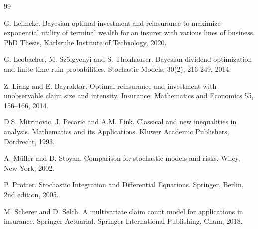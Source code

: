 \documentclass[reqno, 11pt]{amsart}%
\theoremstyle{definition}
\numberwithin{equation}{section} \numberwithin{theorem}{section}
\begin{document}
\begin{thebibliography}{99}


 G. Leimcke. Bayesian optimal investment and reinsurance to maximize exponential utility of terminal wealth for an insurer with various lines of business. PhD Thesis, Karlsruhe Institute of Technology, 2020.

 G. Leobacher, M. Sz\"olgyenyi and S. Thonhauser. Bayesian dividend optimization and finite time ruin probabilities. Stochastic Models, 30(2), 216-249, 2014.

 Z. Liang and E. Bayraktar. Optimal reinsurance and investment with unobservable claim size and intensity. Insurance: Mathematics and Economics 55, 156--166, 2014.



 D.S. Mitrinovic, J. Pecaric and A.M. Fink. Classical and new inequalities in analysis. Mathematics and its Applications. Kluwer Academic Publishers, Dordrecht,  1993.

 A. M\"{u}ller and D. Stoyan. Comparison for stochastic models and risks. Wiley, New York, 2002.

 P. Protter. Stochastic Integration and Differential Equations. Springer, Berlin, 2nd edition, 2005.

 M. Scherer and  D. Selch. A multivariate claim count model for applications in insurance. Springer Actuarial. Springer International Publishing, Cham, 2018.



\end{thebibliography}
\end{document}
